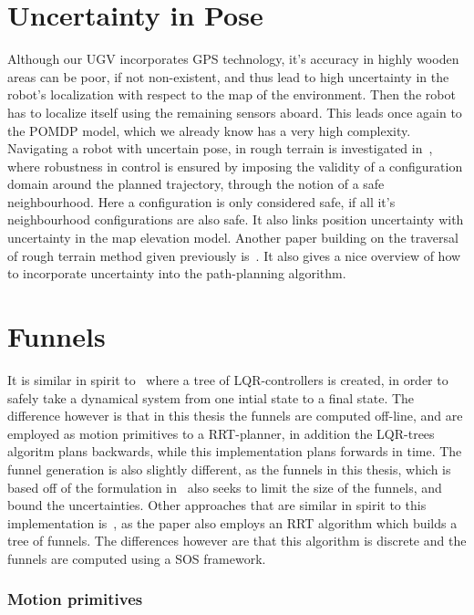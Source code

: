 \section{Uncertainty in Pose}
Although our UGV incorporates GPS technology, it's accuracy in highly wooden
areas can be poor, if not non-existent, and thus lead to high uncertainty in the
robot's localization with respect to the map of the environment. Then the robot
has to localize itself using the remaining sensors aboard. This leads once again
to the POMDP model, which we already know has a very high complexity. Navigating
a robot with uncertain pose, in rough terrain is investigated
in~\cite{haitMotionPlanningRough1996}, where robustness in control is ensured by
imposing the validity of a configuration domain around the planned trajectory,
through the notion of a safe neighbourhood. Here a configuration is only
considered safe, if all it's neighbourhood configurations are also safe. It also
links position uncertainty with uncertainty in the map elevation model. Another
paper building on the traversal of rough terrain method given previously
is~\cite{iagnemmaRapidPhysicsbasedRoughterrain1999}. It also gives a nice
overview of how to incorporate uncertainty into the path-planning algorithm.

\section{Funnels}

It is similar in spirit to~\cite{tedrakeLQRtreesFeedbackMotion2009} where a tree
of \ac{LQR}-controllers is created, in order to safely take a dynamical system
from one intial state to a final state. The difference however is that in this
thesis the funnels are computed off-line, and are employed as motion primitives
to a \ac{RRT}-planner, in addition the \ac{LQR}-trees algoritm plans backwards,
while this implementation plans forwards in time. The funnel generation is also
slightly different, as the funnels in this thesis, which is based off of the
formulation in~\cite{majumdarFunnelLibrariesRealtime2017} also seeks to limit
the size of the funnels, and bound the uncertainties. Other approaches that are
similar in spirit to this implementation
is~\cite{lenySequentialCompositionRobust2012}, as the paper also employs an
\ac{RRT} algorithm which builds a tree of funnels. The differences however are
that this algorithm is discrete and the funnels are computed using a \ac{SOS}
framework.

\subsubsection{Motion primitives}

